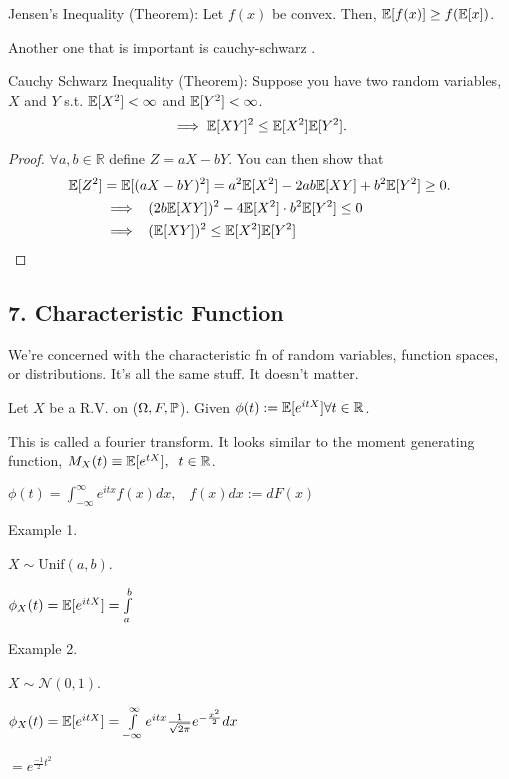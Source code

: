 Jensen's Inequality (Theorem): Let $f(x)$ be convex. Then, $\mathbb{E}[f(x)] \geq f(\mathbb{E}[x])$.

Another one that is important is cauchy-schwarz .

Cauchy Schwarz Inequality (Theorem): Suppose you have two random variables, $X$ and $Y$ s.t. $\mathbb{E}[X^2] < \infty$ and $\mathbb{E}[Y^2] < \infty$.
\[ \implies \mathbb{E}[XY]^2 \leq \mathbb{E}[X^2] \mathbb{E}[Y^2]. \]

\begin{proof}
$\forall a, b \in \mathbb{R}$ define $Z = aX - bY$. You can then show that
\[\begin{aligned}
\mathbb{E}[Z^2] &= \mathbb{E}[(aX - bY)^2] = a^2 \mathbb{E}[X^2] - 2ab \mathbb{E}[XY] + b^2 \mathbb{E}[Y^2] \geq 0 . \\
&\implies \;\; (2b \mathbb{E}[XY])^2 - 4 \mathbb{E}[X^2] \cdot b^2 \mathbb{E}[Y^2] \leq 0 \\
&\implies \;\; (\mathbb{E}[XY])^2 \leq \mathbb{E}[X^2] \mathbb{E}[Y^2]
\end{aligned}\]
\end{proof}


\subsection*{7. Characteristic Function}
We're concerned with the characteristic fn of random variables, function spaces, or distributions. It's all the same stuff. It doesn't matter.

Let $X$ be a R.V. on ($\Omega, F, \mathbb{P}$). Given $\phi(t) := \mathbb{E}[e^{itX}] \forall t\in \mathbb{R}$.

\begin{note}
This is called a fourier transform. It looks similar to the moment generating function,
$M_X(t) \equiv \mathbb{E}[e^{tX}], \;\; t\in\mathbb{R}$.
\end{note}


$\phi(t) = \int_{-\infty}^{\infty} e^{itx} f(x) dx, \;\;\; f(x)dx := dF(x)$

Example 1.

$X\sim \text{Unif}(a, b)$.

$\phi_X(t) = \mathbb{E}[e^{itX}] = \int\limits_a^b$


Example 2.

$X \sim \mathcal{N}(0, 1)$.

$\phi_X(t) = \mathbb{E}[e^{itX}] = \int\limits_{-\infty}^\infty e^{itx} \frac{1}{\sqrt{2\pi}} e^{-\frac{x^2}{2}} dx$

$= e^{\frac{-1}{2}t^2}$


